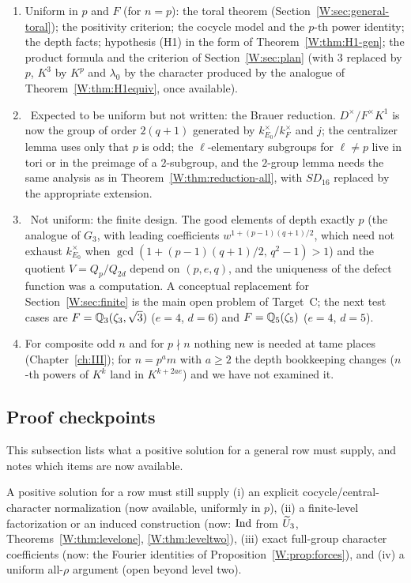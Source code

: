 \begin{remark}\label{W:rem:uniform}
\begin{enumerate}[label=(\roman*)]
\item Uniform in $p$ and $F$ (for $n=p$): the toral theorem
(Section~\ref{W:sec:general-toral}); the positivity criterion; the cocycle
model and the $p$-th power identity; the depth facts; hypothesis (H1)
in the form of Theorem~\ref{W:thm:H1-gen}; the product formula and the
criterion of Section~\ref{W:sec:plan} (with $3$ replaced by $p$, $K^3$ by
$K^{p}$ and $\lambda_0$ by the character produced by the analogue of
Theorem~\ref{W:thm:H1equiv}, once available).
\item \Otag\ Expected to be uniform but not written: the Brauer
reduction.  $D^\times/F^\times K^1$ is now the group of order $2(q+1)$
generated by $k_{E_0}^\times/k_F^\times$ and $j$; the centralizer lemma
uses only that $p$ is odd; the $\ell$-elementary subgroups for
$\ell\ne p$ live in tori or in the preimage of a $2$-subgroup, and
the $2$-group lemma needs the same analysis as in
Theorem~\ref{W:thm:reduction-all}, with $SD_{16}$ replaced by the
appropriate extension.
\item \Ctag\ Not uniform: the finite design.  The good elements of
depth exactly $p$ (the analogue of $G_3$, with leading coefficients
$w^{1+(p-1)(q+1)/2}$, which need not exhaust $k_{E_0}^\times$ when
$\gcd(1+(p-1)(q+1)/2,\,q^2-1)>1$) and the quotient $V=Q_p/Q_{2d}$ depend on
$(p,e,q)$, and the uniqueness of the defect function was a computation.
A conceptual replacement for Section~\ref{W:sec:finite} is the main open
problem of Target~C; the next test cases are $F=\mathbb Q_3(\zeta_3,\sqrt3)$
($e=4$, $d=6$) and $F=\mathbb Q_5(\zeta_5)$ ($e=4$, $d=5$).
\item For composite odd $n$ and for $p\nmid n$ nothing new is needed
at tame places (Chapter~\ref{ch:III}); for $n=p^a m$ with $a\ge2$ the depth
bookkeeping changes ($n$-th powers of $K^k$ land in $K^{k+2ae}$) and we
have not examined it.
\end{enumerate}
\end{remark}

\subsection{Proof checkpoints}
This subsection lists what a positive solution for a general row must supply, and notes which items are now available.

A positive solution for a row must still supply (i) an explicit
cocycle/central-character normalization (now available, uniformly in
$p$), (ii) a finite-level factorization or an induced construction
(now: $\operatorname{Ind}$ from $\widetilde U_3$, Theorems~\ref{W:thm:levelone}, \ref{W:thm:leveltwo}),
(iii) exact full-group character coefficients (now: the Fourier
identities of Proposition~\ref{W:prop:forces}), and (iv) a uniform
all-$\rho$ argument (open beyond level two).

